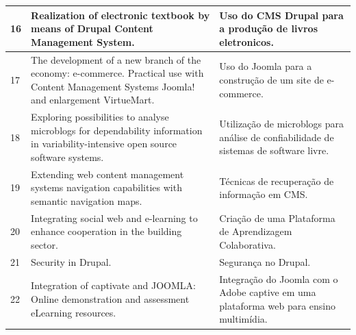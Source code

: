 \begin{apendicesenv}
\begin{landscape}
\begin{longtable}{|p{10pt}|p{320pt}|p{315pt}|}
 	 	  	 	{\raggedright 16}
 	 	  	 & {\raggedright Realization of electronic textbook by means of {Drupal} {Content} {Management} {System}.}
 	 	  	 	 	 	 	 	 & {\raggedright Uso do CMS Drupal para a produção de livros eletronicos.\cite{Iliev2013}} \\
 	 	  	 	 	 	 	 	\hline
 	 	  	 	
 	 	  	 {\raggedright 17}
 	 	  	  	 	   	 	 & {\raggedright The development of a new branch of the economy: e-commerce. {Practical} use with {Content} {Management} {Systems} {Joomla}! and enlargement {VirtueMart}.}
 	 	  	  	 	   	 	 & {\raggedright Uso do Joomla para a construção de um site de e-commerce.\cite{Hetka2009}} \\
 	 	  	  	 	   	 	\hline	
 	 	  	 	
 	 	  	 	
 	 	  	 	{\raggedright 18}
 	 	  	 	 	 	 & {\raggedright Exploring possibilities to analyse microblogs for dependability information in variability-intensive open source software systems. }
 	 	  	 	 	 	 & {\raggedright Utilização de microblogs para análise de confiabilidade de sistemas de software livre.\cite{Galster2013}} \\
 	 	  	 	 	 	\hline
 	 	  	 	 	 	
 	 	  
 	 	   
 	 	   {\raggedright 19}
 	 	    	 	 & {\raggedright Extending web content management systems navigation capabilities with semantic navigation maps.}
 	 	    	 	 & {\raggedright Técnicas de recuperação de informação em CMS.\cite{Distante2010}} \\
 	 	    	 	\hline
 	 	    	 	
 	 	    	 	
 	 	  {\raggedright 20}
 	 	   	 	 & {\raggedright Integrating social web and e-learning to enhance cooperation in the building sector.}
 	 	   	 	 & {\raggedright Criação de uma Plataforma de Aprendizagem Colaborativa.\cite{Longo2014}} \\
 	 	   	 	\hline
 	{\raggedright 21}
  	 	  	 & {\raggedright Security in {Drupal}.}
  	 	  	 	 	 	 	 	 & {\raggedright Segurança no Drupal. \cite{Kumar2014}} \\
  	 	  	 	 	 	 	 	\hline
  	 	  	 	
  	 	  	 {\raggedright 22}
  	 	  	  	 	   	 	 & {\raggedright Integration of captivate and {JOOMLA}: {Online} demonstration and assessment {eLearning} resources.}
  	 	  	  	 	   	 	 & {\raggedright Integração do Joomla com o Adobe captive em uma plataforma web para ensino multimídia.\cite{Aw2010}} \\
  	 	  	  	 	   	 	\hline	
  	 	  	 	

\end{longtable}
\end{landscape}
\end{apendicesenv}

